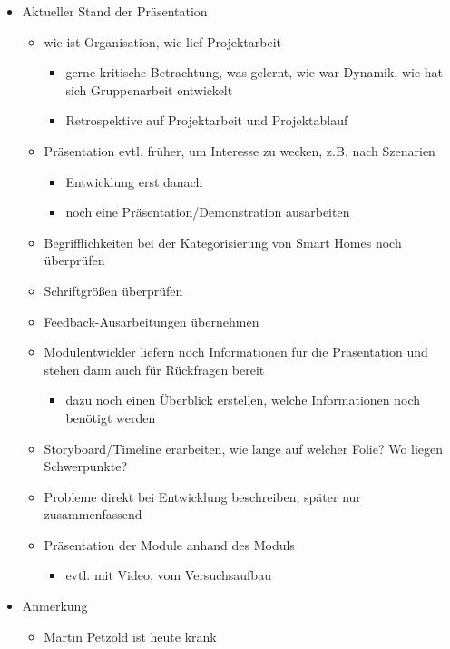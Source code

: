 \begin{itemize}
	\item Aktueller Stand der Präsentation
	\begin{itemize}
		\item wie ist Organisation, wie lief Projektarbeit
		\begin{itemize}
			\item gerne kritische Betrachtung, was gelernt, wie war Dynamik, wie hat sich Gruppenarbeit entwickelt
			\item Retrospektive auf Projektarbeit und Projektablauf
		\end{itemize}
		\item Präsentation evtl. früher, um Interesse zu wecken, z.B. nach Szenarien
		\begin{itemize}
			\item Entwicklung erst danach
			\item noch eine Präsentation/Demonstration ausarbeiten
		\end{itemize}
		\item Begrifflichkeiten bei der Kategorisierung von Smart Homes noch überprüfen
		\item Schriftgrößen überprüfen
		\item Feedback-Ausarbeitungen übernehmen
		\item Modulentwickler liefern noch Informationen für die Präsentation und stehen dann auch für Rückfragen bereit
		\begin{itemize}
			\item dazu noch einen Überblick erstellen, welche Informationen noch benötigt werden
		\end{itemize}
		\item Storyboard/Timeline erarbeiten, wie lange auf welcher Folie? Wo liegen Schwerpunkte?
		\item Probleme direkt bei Entwicklung beschreiben, später nur zusammenfassend
		\item Präsentation der Module anhand des Moduls
		\begin{itemize}
			\item 	evtl. mit Video, vom Versuchsaufbau
		\end{itemize}
	\end{itemize}

	\item Anmerkung
	\begin{itemize}
		\item Martin Petzold ist heute krank
	\end{itemize}
\end{itemize}